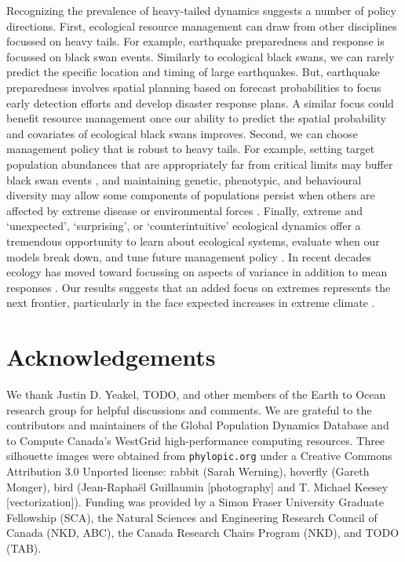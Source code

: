 Recognizing the prevalence of heavy-tailed dynamics suggests a number of policy
directions. First, ecological resource management can draw from other
disciplines focussed on heavy tails. For example, earthquake preparedness and
response is focussed on black swan events. Similarly to ecological black swans,
we can rarely predict the specific location and timing of large earthquakes.
But, earthquake preparedness involves spatial planning based on forecast
probabilities to focus early detection efforts and develop disaster response
plans. A similar focus could benefit resource management once our ability to
predict the spatial probability and covariates of ecological black swans
improves. Second, we can choose management policy that is robust to heavy
tails. For example, setting target population abundances that are appropriately
far from critical limits may buffer black swan events
\citep[e.g.][]{caddy1996}, and maintaining genetic, phenotypic, and behavioural
diversity may allow some components of populations persist when others are
affected by extreme disease or environmental forces
\citep[e.g.][]{schindler2010, anderson2014}. Finally, extreme and `unexpected',
`surprising', or `counterintuitive' ecological dynamics offer a tremendous
opportunity to learn about ecological systems, evaluate when our models break
down, and tune future management policy \citep{doak2008, pine-iii2009,
  lindenmayer2010}. In recent decades ecology has moved toward focussing on
aspects of variance in addition to mean responses \citep[e.g.][]{loreau2010a,
  thompson2013}. Our results suggests that an added focus on extremes
represents the next frontier, particularly in the face expected increases in
extreme climate \citep{meehl2004,ipcc2012}.

\section{Acknowledgements}

We thank Justin D. Yeakel, TODO, and other members of the Earth to Ocean
research group for helpful discussions and comments. We are grateful to the
contributors and maintainers of the Global Population Dynamics Database and to
Compute Canada's WestGrid high-performance computing resources. Three
silhouette images were obtained from \texttt{phylopic.org} under a Creative
Commons Attribution 3.0 Unported license: rabbit (Sarah Werning), hoverfly
(Gareth Monger), bird (Jean-Raphaël Guillaumin {[}photography{]} and T.
Michael Keesey {[}vectorization{]}). Funding was provided by a Simon Fraser
University Graduate Fellowship (SCA), the Natural Sciences and Engineering
Research Council of Canada (NKD, ABC), the Canada Research Chairs Program
(NKD), and TODO (TAB).


